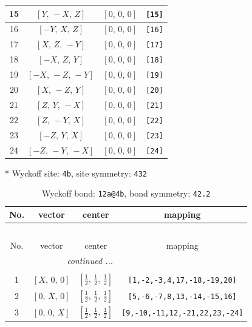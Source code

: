\documentclass[fleqn,8pt]{jsarticle}
\begin{document}
\begin{longtable}{cccc}
15 & $\left[ Y,\, - X,\, Z \right]$ & $\left[ 0,\, 0,\, 0 \right]$ & {\tt [15]} \\ \hline
16 & $\left[ - Y,\, X,\, Z \right]$ & $\left[ 0,\, 0,\, 0 \right]$ & {\tt [16]} \\ \hline
17 & $\left[ X,\, Z,\, - Y \right]$ & $\left[ 0,\, 0,\, 0 \right]$ & {\tt [17]} \\ \hline
18 & $\left[ - X,\, Z,\, Y \right]$ & $\left[ 0,\, 0,\, 0 \right]$ & {\tt [18]} \\ \hline
19 & $\left[ - X,\, - Z,\, - Y \right]$ & $\left[ 0,\, 0,\, 0 \right]$ & {\tt [19]} \\ \hline
20 & $\left[ X,\, - Z,\, Y \right]$ & $\left[ 0,\, 0,\, 0 \right]$ & {\tt [20]} \\ \hline
21 & $\left[ Z,\, Y,\, - X \right]$ & $\left[ 0,\, 0,\, 0 \right]$ & {\tt [21]} \\ \hline
22 & $\left[ Z,\, - Y,\, X \right]$ & $\left[ 0,\, 0,\, 0 \right]$ & {\tt [22]} \\ \hline
23 & $\left[ - Z,\, Y,\, X \right]$ & $\left[ 0,\, 0,\, 0 \right]$ & {\tt [23]} \\ \hline
24 & $\left[ - Z,\, - Y,\, - X \right]$ & $\left[ 0,\, 0,\, 0 \right]$ & {\tt [24]} \\
\end{longtable}
* Wyckoff site: {\tt 4b}, site symmetry: {\tt 432}
\renewcommand{\arraystretch}{1.2}
\begin{longtable}{cccc}
\caption{Wyckoff bond: {\tt 12a@4b}, bond symmetry: {\tt 42.2}}
 \\
 \hline \hline
No. & vector & center & mapping \\ \hline \endfirsthead

\multicolumn{3}{l}{\tablename\ \thetable{}} \\
 \hline \hline
No. & vector & center & mapping \\ \hline \endhead

 \hline \hline
\multicolumn{3}{r}{\footnotesize\it continued ...} \\ \endfoot

 \hline \hline
\multicolumn{3}{r}{} \\ \endlastfoot

1 & $\left[ X,\, 0,\, 0 \right]$ & $\left[ \frac{1}{2},\, \frac{1}{2},\, \frac{1}{2} \right]$ & {\tt [1,-2,-3,4,17,-18,-19,20]} \\ \hline
2 & $\left[ 0,\, X,\, 0 \right]$ & $\left[ \frac{1}{2},\, \frac{1}{2},\, \frac{1}{2} \right]$ & {\tt [5,-6,-7,8,13,-14,-15,16]} \\ \hline
3 & $\left[ 0,\, 0,\, X \right]$ & $\left[ \frac{1}{2},\, \frac{1}{2},\, \frac{1}{2} \right]$ & {\tt [9,-10,-11,12,-21,22,23,-24]} \\
\end{longtable}
\end{document}
